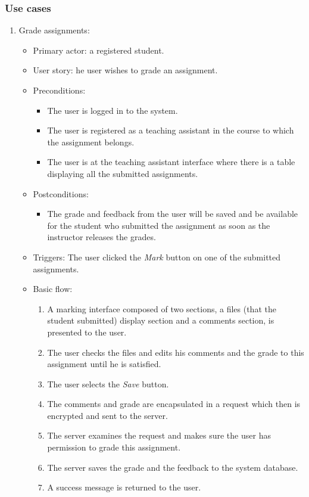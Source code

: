 \subsubsection{Use cases}
\begin{enumerate}
\item Grade assignments:
\begin{itemize}
    \item Primary actor: a registered student.
    \item User story: he user wishes to grade an assignment.
    \item Preconditions:
        \begin{itemize}
            \item The user is logged in to the system.
            \item The user is registered as a teaching assistant in the course
                to which the assignment belongs.
            \item The user is at the teaching assistant interface where there
                is a table displaying all the submitted assignments.
        \end{itemize}
    \item Postconditions:
        \begin{itemize}
            \item The grade and feedback from the user will be saved and be
                available for the student who submitted the assignment as soon
                as the instructor releases the grades.
        \end{itemize}
    \item Triggers:
        The user clicked the \emph{Mark} button on one of the submitted
        assignments.
    \item Basic flow:
        \begin{enumerate}
            \item A marking interface composed of two sections, 
                a files (that the student submitted) display section and
                a comments section, is presented to the user.
            \item The user checks the files and edits his comments and the
                grade to this assignment until he is satisfied.
            \item The user selects the \emph{Save} button.
            \item The comments and grade are encapsulated in a request which
                then is encrypted and sent to the server.
            \item The server examines the request and makes sure the user has
                permission to grade this assignment.
            \item The server saves the grade and the feedback to the system
                database.
            \item A success message is returned to the user.
        \end{enumerate}
\end{itemize}
\end{enumerate}

